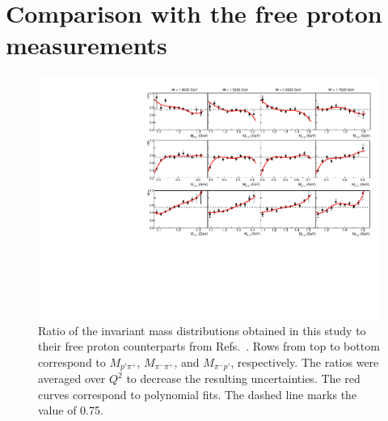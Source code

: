 \documentclass[prc,twocolumn,superscriptaddress,showpacs,amssymb,amsmath,amsfonts,aps,nofootinbib]{revtex4-1}
\begin{document}
\section{Comparison with the free proton measurements}
\label{Sect:with_fed_comp}


\begin{figure}[htp]
\begin{center}
\includegraphics[width=16.25cm]{pictures/fed_comp/mass_new.pdf}
\caption{\small Ratio of the invariant mass distributions obtained in this study to their free proton counterparts from Refs.\!~\cite{Fed_an_note:2017,Fed_paper_2018}. Rows from top to bottom correspond to $M_{p'\pi^{+}}$, $M_{\pi^{-}\pi^{+}}$, and $M_{\pi^{-}p'}$, respectively. The ratios were averaged over $Q^{2}$ to decrease the resulting uncertainties. The red curves correspond to polynomial fits. The dashed line marks the value of 0.75.} \label{fig:fed_mass}
\end{center}
\end{figure}
\end{document}
